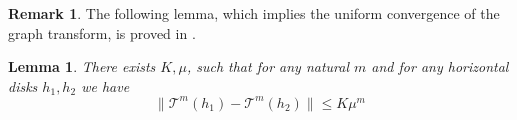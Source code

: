 \documentclass[11pt, leqno]{amsart}
\newtheorem{lem}[thm]{Lemma}
\theoremstyle{definition}
\newtheorem{rem}[thm]{Remark}
\begin{document}
%
%
%
%
%
%

\begin{rem}
	The following lemma, which implies the uniform convergence of the graph transform, is proved in \cite{Geom,Zgliczynski}.\begin{lem}
There exists $K, \mu$, such that for any natural $m$ and
for any horizontal disks $h_1,h_2$ we have
\begin{equation}
\|\mathcal{T}^m(h_1) - \mathcal{T}^m(h_2)\| \leq K \mu^m
\end{equation}
\end{lem}
\end{rem}
\end{document}

